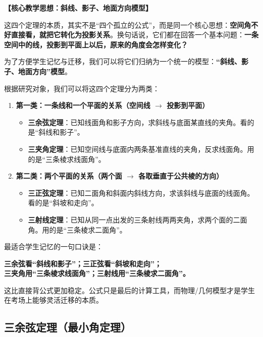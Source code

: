 \documentclass[11pt,a4paper]{ctexart}
\begin{document}
\noindent\textbf{【核心教学思想：斜线、影子、地面方向模型】}\par
这四个定理的本质，其实不是“四个孤立的公式”，而是同一个核心思想：\textbf{空间角不好直接看，就把它转化为投影关系}。换句话说，它们都在回答一个基本问题：\textbf{一条空间中的线，投影到平面上以后，原来的角度会怎样变化？}

为了方便学生记忆与迁移，我们可以将它们归纳为一个统一的模型：\textbf{“斜线、影子、地面方向”模型}。

根据研究对象，我们可以将这四个定理分为两类：
\begin{enumerate}
    \item \textbf{第一类：一条线和一个平面的关系（空间线 $\longrightarrow$ 投影到平面）}
    \begin{itemize}
        \item \textbf{三余弦定理}：已知线面角和影子方向，求斜线与底面某直线的夹角。看的是“斜线和影子”。
        \item \textbf{三夹角定理}：已知空间线与底面内两条基准直线的夹角，反求线面角。用的是“三条棱求线面角”。
    \end{itemize}
    \item \textbf{第二类：两个平面的关系（两个面 $\longrightarrow$ 各取垂直于公共棱的方向）}
    \begin{itemize}
        \item \textbf{三正弦定理}：已知二面角和斜面内斜线方向，求该斜线与底面的线面角。看的是“斜坡和走向”。
        \item \textbf{三射线定理}：已知从同一点出发的三条射线两两夹角，求两个面的二面角。用的是“三条棱求二面角”。
    \end{itemize}
\end{enumerate}

最适合学生记忆的一句口诀是：
\begin{center}
\textbf{三余弦看“斜线和影子”；三正弦看“斜坡和走向”；\\
三夹角用“三条棱求线面角”；三射线用“三条棱求二面角”。}
\end{center}
这比直接背公式更加稳定。公式只是最后的计算工具，而物理/几何模型才是学生在考场上能够灵活迁移的本质。


\subsection{三余弦定理（最小角定理）}
\end{document}

